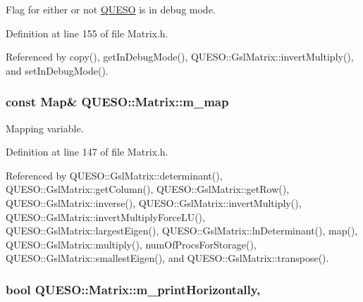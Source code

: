 Flag for either or not \hyperlink{namespace_q_u_e_s_o}{Q\-U\-E\-S\-O} is in debug mode. 



Definition at line 155 of file Matrix.\-h.



Referenced by copy(), get\-In\-Debug\-Mode(), Q\-U\-E\-S\-O\-::\-Gsl\-Matrix\-::invert\-Multiply(), and set\-In\-Debug\-Mode().

\hypertarget{class_q_u_e_s_o_1_1_matrix_adb42d344c0b2859c3b4a4f5a3dd7875f}{
\subsubsection[{m\-\_\-map}]{\setlength{\rightskip}{0pt plus 5cm}const {\bf Map}\& Q\-U\-E\-S\-O\-::\-Matrix\-::m\-\_\-map\hspace{0.3cm}{\ttfamily [protected]}}}\label{class_q_u_e_s_o_1_1_matrix_adb42d344c0b2859c3b4a4f5a3dd7875f}


Mapping variable. 



Definition at line 147 of file Matrix.\-h.



Referenced by Q\-U\-E\-S\-O\-::\-Gsl\-Matrix\-::determinant(), Q\-U\-E\-S\-O\-::\-Gsl\-Matrix\-::get\-Column(), Q\-U\-E\-S\-O\-::\-Gsl\-Matrix\-::get\-Row(), Q\-U\-E\-S\-O\-::\-Gsl\-Matrix\-::inverse(), Q\-U\-E\-S\-O\-::\-Gsl\-Matrix\-::invert\-Multiply(), Q\-U\-E\-S\-O\-::\-Gsl\-Matrix\-::invert\-Multiply\-Force\-L\-U(), Q\-U\-E\-S\-O\-::\-Gsl\-Matrix\-::largest\-Eigen(), Q\-U\-E\-S\-O\-::\-Gsl\-Matrix\-::ln\-Determinant(), map(), Q\-U\-E\-S\-O\-::\-Gsl\-Matrix\-::multiply(), num\-Of\-Procs\-For\-Storage(), Q\-U\-E\-S\-O\-::\-Gsl\-Matrix\-::smallest\-Eigen(), and Q\-U\-E\-S\-O\-::\-Gsl\-Matrix\-::transpose().

\hypertarget{class_q_u_e_s_o_1_1_matrix_aebf5e44b149cf1454b2e12995d9f8b6b}{
\subsubsection[{m\-\_\-print\-Horizontally}]{\setlength{\rightskip}{0pt plus 5cm}bool Q\-U\-E\-S\-O\-::\-Matrix\-::m\-\_\-print\-Horizontally\hspace{0.3cm}{\ttfamily [mutable]}, {\ttfamily [protected]}}}\label{class_q_u_e_s_o_1_1_matrix_aebf5e44b149cf1454b2e12995d9f8b6b}


